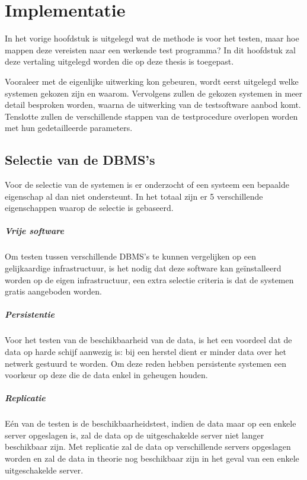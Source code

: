 \chapter{Implementatie}
In het vorige hoofdstuk is uitgelegd wat de methode is voor het testen, maar hoe mappen deze vereisten naar een werkende test programma? In dit hoofdstuk zal deze vertaling uitgelegd worden die op deze thesis is toegepast. 

Vooraleer met de eigenlijke uitwerking kon gebeuren, wordt eerst uitgelegd welke systemen gekozen zijn en waarom. 
Vervolgens zullen de gekozen systemen in meer detail besproken worden, waarna de uitwerking van de testsoftware aanbod komt. Tenslotte zullen de verschillende stappen van de testprocedure overlopen worden met hun gedetailleerde parameters.  
\section{Selectie van de DBMS's}
Voor de selectie van de systemen is er onderzocht of een systeem een bepaalde eigenschap al dan niet ondersteunt. In het totaal zijn er 5 verschillende eigenschappen waarop de selectie is gebaseerd. 

\paragraph{Vrije software} Om testen tussen verschillende DBMS's te kunnen vergelijken op een gelijkaardige infrastructuur, is het nodig dat deze software kan geïnstalleerd worden op de eigen infrastructuur, een extra selectie criteria is dat de systemen gratis aangeboden worden. 

\paragraph{Persistentie} Voor het testen van de beschikbaarheid van de data, is het een voordeel dat de data op harde schijf aanwezig is: bij een herstel dient er minder data over het netwerk gestuurd te worden. Om deze reden hebben persistente systemen een voorkeur op deze die de data enkel in geheugen houden. 

\paragraph{Replicatie} Eén van de testen is de beschikbaarheidstest, indien de data maar op een enkele server opgeslagen is, zal de data op de uitgeschakelde server niet langer beschikbaar zijn. Met replicatie zal de data op verschillende servers opgeslagen worden en zal de data in theorie nog beschikbaar zijn in het geval van een enkele uitgeschakelde server. 


